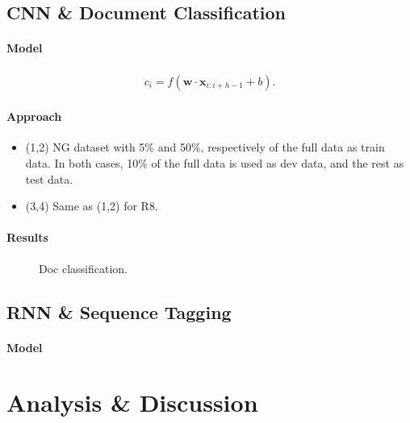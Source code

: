 \subsection{CNN \& Document Classification}

\paragraph{Model}

\begin{align*}
  c_i = f(\mathbf{w}\cdot \mathbf{x}_{i:i+h-1}+b).
\end{align*}

\paragraph{Approach}

\begin{itemize}[noitemsep,leftmargin=0.6cm]
\item (1,2) NG dataset with 5\% and 50\%, respectively of the full data as train data. In both cases, 10\% of the full data is used as dev data, and the rest as test data.  
\item (3,4) Same as (1,2) for R8. 
\end{itemize}

\paragraph{Results}

\begin{figure}[!htb]
\centering
\scalebox{0.5}{}
\caption{Doc classification.}
\label{fig:doc}
\end{figure}

\subsection{RNN \& Sequence Tagging}
\paragraph{Model}






\section{Analysis \& Discussion}\label{sec:analysis}


